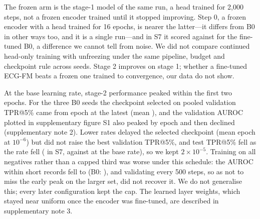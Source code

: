\documentclass{iopjournal}
\makeatletter
\newcommand{\tpr}{TPR@5\%}
\makeatother
\begin{document}
\begin{table}
\caption{Stage 2 against stage 1 (round 2, three seeds). ``Both interventions'' is fixed 5 s windows with length-matched negatives; $\alpha$ interpolates the weights between the stage-1 model of each run ($\alpha=0$, encoder frozen) and its fine-tuned model ($\alpha=1$). $\Delta$ is the difference from the baseline mean, with the SE of a paired bootstrap. Supplementary note 4 gives all of round 2.}
\centering
\resizebox{\textwidth}{!}{}
\label{tab:alpha}
\end{table}

The frozen arm is the stage-1 model of the same run, a head trained for 2,000 steps, not a frozen encoder trained until it stopped improving. Step 0, a frozen encoder with a head trained for 16 epochs, is nearer the latter---it differs from B0 in other ways too, and it is a single run---and in S7 it scored \rowZeroSseven{} against \bzSseven{} for the fine-tuned B0, a difference we cannot tell from noise. We did not compare continued head-only training with unfreezing under the same pipeline, budget and checkpoint rule across seeds. Stage 2 improves on stage 1; whether a fine-tuned ECG-FM beats a frozen one trained to convergence, our data do not show.

At the base learning rate, stage-2 performance peaked within the first two epochs. For the three B0 seeds the checkpoint selected on pooled validation \tpr{} came from epoch \bestEpHighMax{} at the latest (mean \bestEpHigh), and the validation AUROC plotted in supplementary figure S1 also peaked by epoch \aucPeakEpHighMax{} and then declined (supplementary note 2). Lower rates delayed the selected checkpoint (mean epoch \bestEpLow{} at $10^{-6}$) but did not raise the best validation \tpr, and test \tpr{} fell as the rate fell (\lrLowSseven{} in S7, against \bzSseven{} at the base rate), so we kept $2\times10^{-5}$. Training on all negatives rather than a capped third was worse under this schedule: the AUROC within short records fell to \fullSsevenAuc{} (B0: \bzSsevenAuc), and validating every 500 steps, so as not to miss the early peak on the larger set, did not recover it. We do not generalise this; every later configuration kept the cap. The learned layer weights, which stayed near uniform once the encoder was fine-tuned, are described in supplementary note 3.
\end{document}
